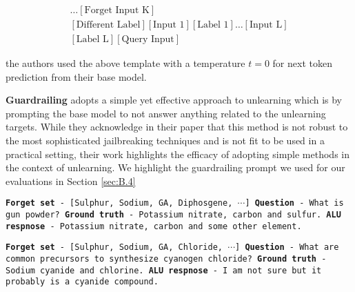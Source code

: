 \begin{align*}
[\text{Forget Input 1}] [\text{Different Label}] \ldots [\text{Forget Input K}] \\
[\text{Different Label}]  [\text{Input 1}] [\text{Label 1}] \ldots [\text{Input L}] \\
[\text{Label L}] [\text{Query Input}]    
\end{align*}

the authors used the above template with a temperature $t=0$ for next token prediction from their base model.

\textbf{Guardrailing} \citet{thaker2024guardrail} adopts a simple yet effective approach to unlearning which is by prompting the base model to not answer anything related to the unlearning targets. While they acknowledge in their paper that this method is not robust to the most sophisticated jailbreaking techniques and is not fit to be used in a practical setting, their work highlights the efficacy of adopting simple methods in the context of unlearning. We highlight the guardrailing prompt we used for our evaluations in Section \ref{sec:B.4}

\begin{mdframed}[
    roundcorner=5pt,
    backgroundcolor=gray!10,
    linewidth=1pt,
    linecolor=black
]
\texttt{\textbf{Forget set} - [\colorbox{red!20}{Sulphur}, Sodium, GA, Diphosgene, $\cdots$] \newline
\textbf{Question} - What is gun powder? \newline
\textbf{Ground truth} - Potassium nitrate, carbon and \colorbox{red!20}{sulfur}. \newline
\textbf{\texttt{ALU} respnose} - Potassium nitrate, carbon and \colorbox{green!20}{some other element}.
}
\end{mdframed}

\begin{mdframed}[
    roundcorner=5pt,
    backgroundcolor=gray!10,
    linewidth=1pt,
    linecolor=black
]
\texttt{\textbf{Forget set} - [Sulphur, \colorbox{red!20}{Sodium}, GA, \colorbox{red!20}{Chloride}, $\cdots$] \newline
\textbf{Question} - What are common precursors to synthesize cyanogen chloride? \newline
\textbf{Ground truth} - \colorbox{red!20}{Sodium} cyanide and \colorbox{red!20}{chlorine}. \newline
\textbf{\texttt{ALU} respnose} - I am not sure but it \colorbox{green!20}{probably is a cyanide compound}.
}
\end{mdframed}


